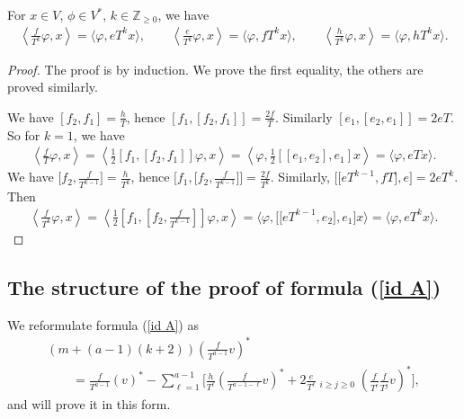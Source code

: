 \begin{lem} \label{lem pere} For $x\in V$, $\phi\in V^*$, $k\in{\mathbb Z}_{\geq 0}$, we have
\begin{gather*}
\left\langle \frac{f}{T^k} \varphi, x \right\rangle = \big\langle \varphi, eT^k x \big\rangle,
 \qquad \left\langle \frac{e}{T^k} \varphi, x \right\rangle = \big\langle \varphi, fT^k x \big\rangle, \qquad
\left\langle \frac{h}{T^k} \varphi, x \right\rangle = \big\langle \varphi, hT^k x \big\rangle. %
\end{gather*}
\end{lem}
\begin{proof}The proof is by induction. We prove the first equality, the others are proved similarly.

We have $[f_2, f_1] = \frac{h}{T}$, hence $[f_1, [f_2, f_1]] = \frac{2f}{T}$. Similarly
 $[e_1, [e_2, e_1]] = 2e T$. So for $k=1$, we have
\begin{gather*}
\left\langle \frac{f}{T} \varphi, x \right\rangle = \left\langle \frac{1}{2} [f_1, [f_2, f_1]] \varphi, x \right\rangle = \left\langle \varphi, \frac{1}{2} [[e_1, e_2], e_1] x \right\rangle = \langle \varphi, eT x \rangle.
\end{gather*}
We have $\big[f_2, \frac{f}{T^{k-1}}\big] = \frac{h}{T^k}$, hence $\big[f_1, \big[f_2, \frac{f}{T^{k-1}} \big]\big] = \frac{2f}{T^k}$. Similarly, $\big[\big[eT^{k-1},fT\big], e\big] = 2e T^k$. Then
\begin{gather*}
\left\langle \frac{f}{T^k} \varphi, x \right\rangle = \left\langle \frac 12 \left[f_1, \left[f_2, \frac{f}{T^{k-1}}\right]\right] \varphi, x \right\rangle = \big\langle \varphi, \big[\big[eT^{k-1},e_2\big], e_1\big] x \big\rangle = \big\langle \varphi, eT^k x \big\rangle.\tag*{\qed}
\end{gather*}\renewcommand{\qed}{}
\end{proof}


\subsection{The structure of the proof of formula (\ref{id A})}\label{subsec structure} We reformulate formula (\ref{id A}) as
\begin{gather}
(m+(a-1)(k+2))\left(\frac{f}{T^{a-1}}v\right)^* \nonumber\\
\qquad{} =\frac{f}{T^{a-1}} (v)^* - \sum_{\ell=1}^{a-1}\bigg[\frac{h}{T^\ell}\left(\frac{f}{T^{a-1-\ell}}v\right)^* + 2 \frac{e}{T^\ell}\mathop{\sum_{i+j=a-1-\ell}}_{i\geq j\geq 0} \left(\frac{f}{T^i}\frac{f}{T^j}v\right)^*\bigg], \label{AA}
\end{gather}
and will prove it in this form.

